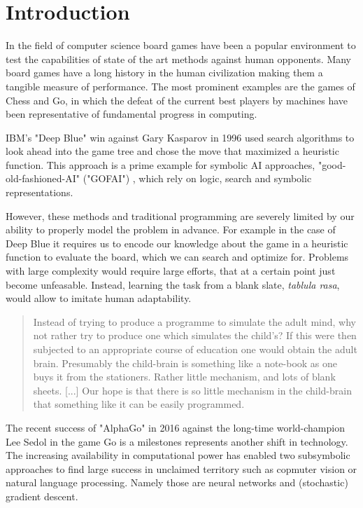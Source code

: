 \chapter{Introduction}

In the field of computer science board games have been a popular environment to test the capabilities of state of the art methods against human opponents. Many board games have a long history in the human civilization making them a tangible measure of performance. The most prominent examples are the games of Chess and Go, in which the defeat of the current best players by machines have been representative of fundamental progress in computing.

IBM's "Deep Blue" win against Gary Kasparov in 1996 \cite{higgins_brief_2017} used search algorithms to look ahead into the game tree and chose the move that maximized a heuristic function. This approach is a prime example for symbolic AI approaches, "good-old-fashioned-AI" ("GOFAI") \cite{haugeland_artificial_1985}, which rely on logic, search and symbolic representations.

However, these methods and traditional programming are severely limited by our ability to properly model the problem in advance. For example in the case of Deep Blue it requires us to encode our knowledge about the game in a heuristic function to evaluate the board, which we can search and optimize for. Problems with large complexity would require large efforts, that at a certain point just become unfeasable. Instead, learning the task from a blank slate, \emph{tablula rasa}, would allow to imitate human adaptability.

\begin{quote}
    Instead of trying to produce a programme to simulate the adult mind, why not rather try to produce one which simulates the child’s? If this were then subjected to an appropriate course of education one would obtain the adult brain. Presumably the child-brain is something like a note-book as one buys it from the stationers. Rather little mechanism, and lots of blank sheets. [...] Our hope is that there is so little mechanism in the child-brain that something like it can be easily programmed.
    \cite{turing_icomputing_1950}
\end{quote}

The recent success of "AlphaGo" in 2016 against the long-time world-champion Lee Sedol \cite{deepmind_match_nodate} in the game Go is a milestones represents another shift in technology. The increasing availability in computational power has enabled two subsymbolic approaches to find large success in unclaimed territory such as copmuter vision or natural language processing. Namely those are neural networks and (stochastic) gradient descent. \cite{nilsson_artificial_1998}

